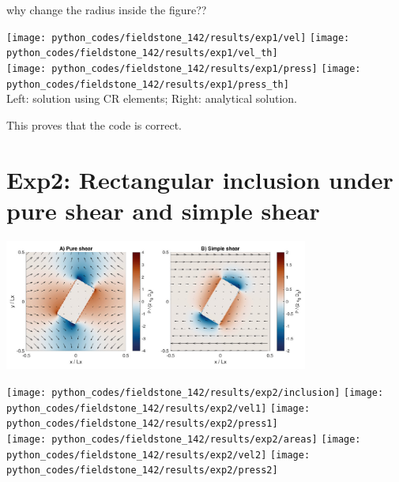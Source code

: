 why change the radius inside the figure??


\begin{center}
\texttt{[image: python\_codes/fieldstone\_142/results/exp1/vel]}
\texttt{[image: python\_codes/fieldstone\_142/results/exp1/vel\_th]}\\
\texttt{[image: python\_codes/fieldstone\_142/results/exp1/press]}
\texttt{[image: python\_codes/fieldstone\_142/results/exp1/press\_th]}\\
{\captionfont Left: solution using CR elements; Right: analytical solution.}
\end{center}

This proves that the code is correct.

\section*{Exp2: Rectangular inclusion under pure shear and simple shear}



\begin{center}
\includegraphics[width=10cm]{python_codes/fieldstone_142/images/hams22_c}\\
\end{center}

\begin{center}
\texttt{[image: python\_codes/fieldstone\_142/results/exp2/inclusion]}
\texttt{[image: python\_codes/fieldstone\_142/results/exp2/vel1]}
\texttt{[image: python\_codes/fieldstone\_142/results/exp2/press1]}\\
\texttt{[image: python\_codes/fieldstone\_142/results/exp2/areas]}
\texttt{[image: python\_codes/fieldstone\_142/results/exp2/vel2]}
\texttt{[image: python\_codes/fieldstone\_142/results/exp2/press2]}
\end{center}

